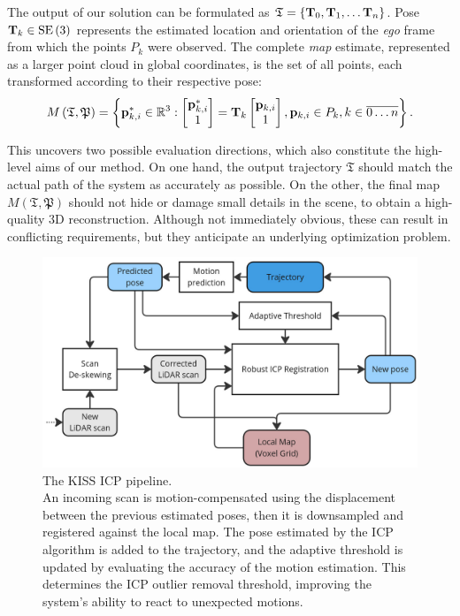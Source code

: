 The output of our solution can be formulated as $\mathfrak{T} = \left\{ \mathbf{T}_0, \mathbf{T}_1, \dots \mathbf{T}_n\right\}$. Pose \mbox{$\mathbf{T}_k \in \operatorname{SE}\left(3\right)$} represents the estimated location and orientation of the \emph{ego} frame from which the points $P_k$ were observed. The complete \emph{map} estimate, represented as a larger point cloud in global coordinates, is the set of all points, each transformed according to their respective pose:
\begin{equation}
	M\left(\mathfrak{T}, \mathfrak{P}\right) =
	\left\{
	\mathbf{p}_{k,i}^* \in {\mathbb{R}}^3:
	\begin{bmatrix}
		\mathbf{p}_{k,i}^* \\ 1
	\end{bmatrix} =
	\mathbf{T}_k \begin{bmatrix}
		\mathbf{p}_{k,i} \\ 1
	\end{bmatrix}, \mathbf{p}_{k,i} \in P_k, k \in \overline{0 \dots n}
	\right\}\text{.}
\end{equation}

This uncovers two possible evaluation directions, which also constitute the high-level aims of our method. On one hand, the output trajectory  $\mathfrak{T}$ should match the actual path of the system as accurately as possible. On the other, the final map $M\left(\mathfrak{T}, \mathfrak{P}\right)$ should not hide or damage small details in the scene, to obtain a high-quality 3D reconstruction. Although not immediately obvious, these can result in conflicting requirements, but they anticipate an underlying optimization problem.

\begin{figure}[h]
	\centering
	\includegraphics[width=0.6\linewidth]{images/kiss-icp-architecture.jpg}
	\caption[KISS ICP Architecture]{The KISS ICP pipeline.\\An incoming scan is motion-compensated using the displacement between the previous estimated poses, then it is downsampled and registered against the local map. The pose estimated by the ICP algorithm is added to the trajectory, and the adaptive threshold is updated by evaluating the accuracy of the motion estimation. This determines the ICP outlier removal threshold, improving the system's ability to react to unexpected motions.}
	\label{fig:kiss-icp-architecture}
\end{figure}

